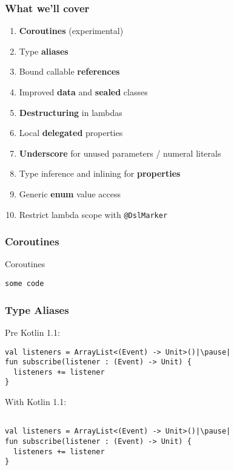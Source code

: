 


\begin{frame}\frametitle{What we'll cover}
  \begin{enumerate}[<+->]
  	\item \textbf{Coroutines} (experimental)
	\item Type \textbf{aliases}
	\item Bound callable \textbf{references}
	\item Improved \textbf{data} and \textbf{sealed} classes
	\item \textbf{Destructuring} in lambdas
	\item Local \textbf{delegated} properties
	\item \textbf{Underscore} for unused parameters / numeral literals %
	\item Type inference and inlining for \textbf{properties} %
	\item Generic \textbf{enum} value access
	\item Restrict lambda scope with \texttt{@DslMarker}
  \end{enumerate}
\end{frame}

\begin{frame}[fragile] \frametitle{Coroutines}
Coroutines
\begin{lstlisting}
some code
\end{lstlisting}
\end{frame}

\begin{frame}[fragile] \frametitle{Type Aliases}
Pre Kotlin 1.1:
\begin{lstlisting}
val listeners = ArrayList<(Event) -> Unit>()|\pause|
fun subscribe(listener : (Event) -> Unit) {
  listeners += listener
}
\end{lstlisting}
\pause
With Kotlin 1.1:
\begin{lstlisting}

val listeners = ArrayList<(Event) -> Unit>()|\pause|
fun subscribe(listener : (Event) -> Unit) {
  listeners += listener
}
\end{lstlisting}
\end{frame}


